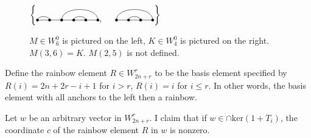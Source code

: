 \documentclass{amsart}
\begin{document}
\begin{figure} 
	\def\cbasisspacing{5mm}
	$\cbr{
		\begin{gathered}
		\Matching{6}{1/2, 3/6, 4/5}, \hspace{\cbasisspacing}
		\Matching{4}{1/4, 2/3}
		\end{gathered}}$
	\caption{$M\in W_6^0$ is pictured on the left, $K\in W_4^0$ is pictured on the right. $M(3,6)=K$. $M(2,5)$ is not defined.}
	\label{S6 Basis}
\end{figure}

Define the rainbow element $R\in W_{2n+r}^r$ to be the basis element specified by $R(i)=2n+2r-i+1$ for $i>r$, $R(i)=i$ for $i\leq r$. In other words, the basis element with all anchors to the left then a rainbow.

\begin{proposition}
	Let $w$ be an arbitrary vector in $W_{2n+r}^r$. I claim that if $w\in \cap\text{ker}(1+T_i)$, the coordinate $c$ of the rainbow element $R$ in $w$ is nonzero.
\end{proposition}	
\end{document}
